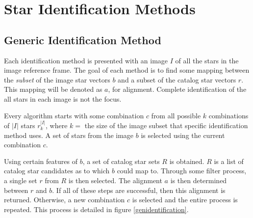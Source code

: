 \section{Star Identification Methods}


\subsection{Generic Identification Method}
Each identification method is presented with an image $I$ of all the stars in the image reference frame. The goal of each method is to find some mapping between the \textit{subset} of the image star vectors $b$ and a subset of the catalog star vectors $r$. This mapping will be denoted as $a$, for alignment. Complete identification of the all stars in each image is not the focus.

Every algorithm starts with some combination $c$ from all possible $k$ combinations of $|I|$ stars $r_k^{|I|}$, where $k = $ the size of the image subset that specific identification method uses. A set of stars from the image $b$ is selected using the current combination $c$. 

Using certain features of $b$, a set of catalog star sets $R$ is obtained. $R$ is a list of catalog star candidates as to which $b$ could map to. Through some filter process, a single set $r$ from $R$ is then selected. The alignment $a$ is then determined between $r$ and $b$. If all of these steps are successful, then this alignment is returned. Otherwise, a new combination $c$ is selected and the entire process is repeated. This process is detailed in figure \eqref{genidentification}.

\begin{figure}
\label{genidentification}
\end{figure}


